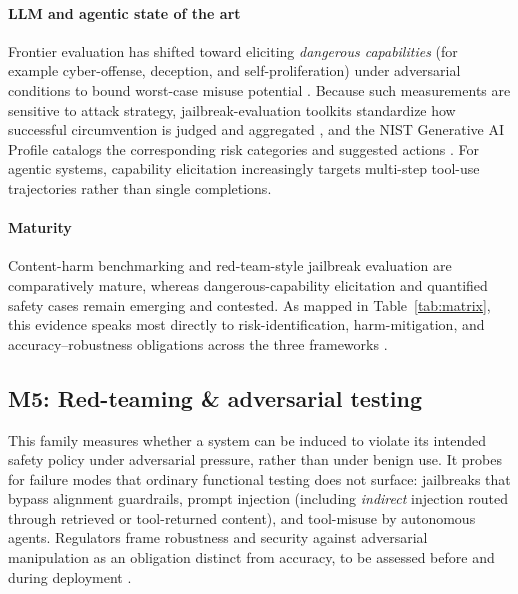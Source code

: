 \paragraph{LLM and agentic state of the art} Frontier evaluation has shifted toward eliciting \textit{dangerous capabilities} (for example cyber-offense, deception, and self-proliferation) under adversarial conditions to bound worst-case misuse potential \cite{hendel2024dangerouseval}. Because such measurements are sensitive to attack strategy, jailbreak-evaluation toolkits standardize how successful circumvention is judged and aggregated \cite{akhtar2024jailbreakeval}, and the NIST Generative AI Profile catalogs the corresponding risk categories and suggested actions \cite{nist2024genai}. For agentic systems, capability elicitation increasingly targets multi-step tool-use trajectories rather than single completions.

\paragraph{Maturity} Content-harm benchmarking and red-team-style jailbreak evaluation are comparatively mature, whereas dangerous-capability elicitation and quantified safety cases remain emerging and contested. As mapped in Table~\ref{tab:matrix}, this evidence speaks most directly to risk-identification, harm-mitigation, and accuracy--robustness obligations across the three frameworks \cite{nist2023airmf,euaiact2024,iso42001}.

\subsection{M5: Red-teaming \& adversarial testing}

This family measures whether a system can be induced to violate its intended safety policy under adversarial pressure, rather than under benign use. It probes for failure modes that ordinary functional testing does not surface: jailbreaks that bypass alignment guardrails, prompt injection (including \textit{indirect} injection routed through retrieved or tool-returned content), and tool-misuse by autonomous agents. Regulators frame robustness and security against adversarial manipulation as an obligation distinct from accuracy, to be assessed before and during deployment \cite{euaiact2024,nist2023airmf}.

